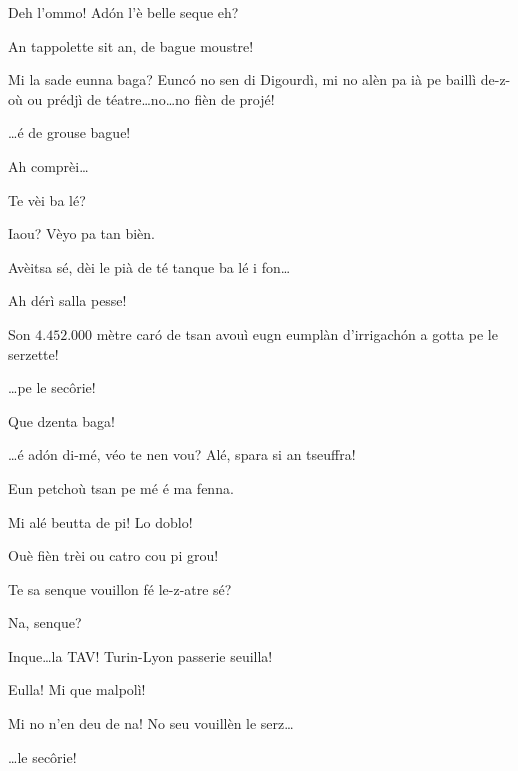 \begin{drama}

\Dallasspeaks Deh l'ommo! Ad\'on l'è belle seque eh?

\Pompiolenspeaks An tappolette sit an, de bague moustre!

\Dallasspeaks Mi la sade eunna baga? Eunc\'o no sen di Digourdì, mi no alèn pa ià pe baillì de-z-où ou prédjì de téatre\ldots no\ldots no fièn de projé!

\Joellespeaks \ldots é de grouse bague!

\Pompiolenspeaks Ah comprèi\ldots

\Dallasspeaks{} Te vèi ba lé?


\Pompiolenspeaks {} Iaou? Vèyo pa tan bièn.

\Dallasspeaks Avèitsa sé, dèi le pià de té tanque ba lé i fon\ldots

\Pompiolenspeaks Ah dérì salla pesse!

\Dallasspeaks Son $4.452.000$ mètre car\'o de tsan avouì eugn eumplàn d'irrigach\'on a gotta pe le serzette!

\Joellespeaks \ldots pe le sec\^orie! 

\Pompiolenspeaks Que dzenta baga!

\Dallasspeaks \ldots é ad\'on di-mé, véo te nen vou? Alé, spara si an tseuffra!

\Pompiolenspeaks Eun petchoù tsan pe mé é ma fenna.

\Dallasspeaks Mi alé beutta de pi! Lo doblo!

\Joellespeaks Ouè fièn trèi ou catro cou pi grou!

\Dallasspeaks {} Te sa senque vouillon fé le-z-atre sé?

\Pompiolenspeaks Na, senque?

\Dallasspeaks Inque\ldots la TAV! Turin-Lyon passerie seuilla!

\Pompiolenspeaks {} Eulla! Mi que malpolì!

\Dallasspeaks Mi no n'en deu de na! No seu vouillèn le serz\ldots


\Dallasspeaks \ldots le sec\^orie!


\end{drama}
